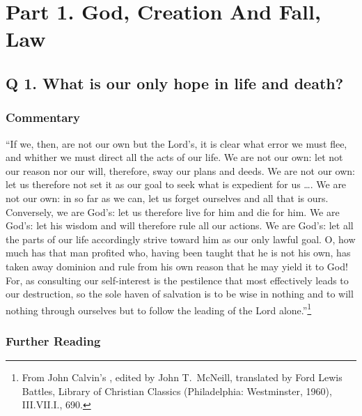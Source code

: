 \documentclass[00-main.tex]{subfiles}
\begin{document}
\section{Part 1. God, Creation And Fall, Law}

\subsection{Q  1. What is our only hope in life and death?}


\subsubsection{Commentary}

\label{q1comment}``If we, then, are not our own but the Lord's, it is clear what error we must flee, and whither we must direct all the acts of our life. We are not our own: let not our reason nor our will, therefore, sway our plans and deeds. We are not our own: let us therefore not set it as our goal to seek what is expedient for us  \dots{}. We are not our own: in so far as we can, let us forget ourselves and all that is ours. Conversely, we are God's: let us therefore live for him and die for him. We are God's: let his wisdom and will therefore rule all our actions. We are God's: let all the parts of our life accordingly strive toward him as our only lawful goal. O, how much has that man profited who, having been taught that he is not his own, has taken away dominion and rule from his own reason that he may yield it to God! For, as consulting our self-interest is the pestilence that most effectively leads to our destruction, so the sole haven of salvation is to be wise in nothing and to will nothing through ourselves but to follow the leading of the Lord alone.''\footnote{From John Calvin's , edited by John T.\ McNeill, translated by Ford Lewis Battles, Library of Christian Classics (Philadelphia: Westminster, 1960), III.VII.I., 690.}

\subsubsection{Further Reading}
\end{document}
